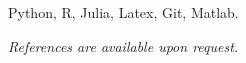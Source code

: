 \documentclass[
  date,
  number,
]{wgu-cv}
\begin{document}

Python,
R,
Julia,
Latex,
Git,
Matlab.



\emph{References are available upon request.}



\nobibliography*
\end{document}
